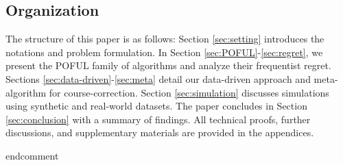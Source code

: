 \subsection{Organization}

The structure of this paper is as follows: Section \ref{sec:setting} introduces the notations and problem formulation. In Section \ref{sec:POFUL}-\ref{sec:regret}, we present the POFUL family of algorithms and analyze their frequentist regret. 
Sections \ref{sec:data-driven}-\ref{sec:meta} detail our data-driven approach and meta-algorithm for course-correction. Section  \ref{sec:simulation} discusses simulations using synthetic and real-world datasets. The paper concludes in Section \ref{sec:conclusion} with a summary of findings. All technical proofs, further discussions, and supplementary materials are provided in the appendices.
 
  end{comment}
